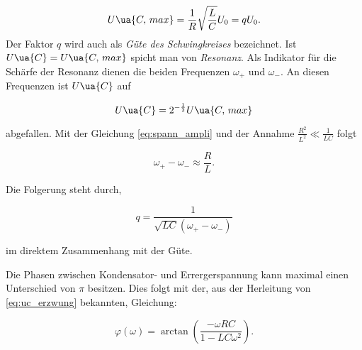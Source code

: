 \begin{equation}
  \label{eq:spann_ampli}
  U\ua{C,\, max}=\frac{1}{R}\sqrt{\frac{L}{C}}U_0=qU_0.
\end{equation}
Der Faktor $q$ wird auch als \emph{Güte des Schwingkreises} bezeichnet.
Ist $U\ua{C}=U\ua{C,\, max}$ spicht man von \emph{Resonanz}.
Als Indikator für die Schärfe der Resonanz dienen die beiden
Frequenzen $\omega_+$ und $\omega_-$. An diesen Frequenzen ist
$U\ua{C}$ auf

\begin{equation*}
   U\ua{C}=2^{-\frac{1}{2}} U\ua{C,\, max}
\end{equation*}

abgefallen.
Mit der Gleichung \eqref{eq:spann_ampli} und der Annahme $\frac{R^2}{L^2}\ll \frac{1}{LC}$
folgt

\begin{equation}
  \label{eq:omega_+_-}
  \omega_+-\omega_-\approx \frac{R}{L}.
\end{equation}

Die Folgerung steht durch, %

\begin{equation*}
  q=\frac{1}{\sqrt{LC}\left(\omega_+-\omega_-\right)}
\end{equation*}

im direktem Zusammenhang mit der Güte.

Die Phasen zwischen Kondensator- und Errergerspannung kann maximal
einen Unterschied von $\pi$ besitzen. Dies folgt mit der, aus der
Herleitung von \eqref{eq:uc_erzwung} bekannten, Gleichung:

\begin{equation}
  \label{eq:phase}
  \varphi(\omega)=\arctan\left(\frac{-\omega RC}{1-LC\omega^2}\right).
\end{equation}
